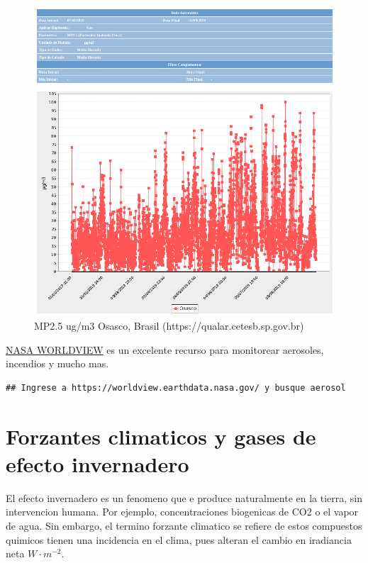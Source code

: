 \documentclass[]{book}
\begin{document}
\begin{figure}
\includegraphics[width=1.5\linewidth]{figs/brazil} \caption{MP2.5 ug/m3 Osasco, Brasil (https://qualar.cetesb.sp.gov.br)}\label{fig:unnamed-chunk-14}
\end{figure}

\href{https://worldview.earthdata.nasa.gov/}{NASA WORLDVIEW} es un excelente recurso para monitorear aerosoles, incendios y mucho mas.

\begin{verbatim}
## Ingrese a https://worldview.earthdata.nasa.gov/ y busque aerosol
\end{verbatim}

\hypertarget{forzantes-climaticos-y-gases-de-efecto-invernadero}{%
\section{Forzantes climaticos y gases de efecto invernadero}\label{forzantes-climaticos-y-gases-de-efecto-invernadero}}

El efecto invernadero es un fenomeno que e produce naturalmente en la tierra, sin intervencion humana. Por ejemplo, concentraciones biogenicas de CO2 o el vapor de agua. Sin embargo, el termino forzante climatico se refiere de estos compuestos quimicos tienen una incidencia en el clima, pues alteran el cambio en iradiancia neta \(W \cdot m^{-2}\).
\end{document}
